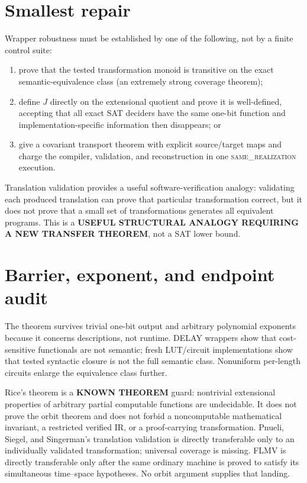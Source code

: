 \documentclass[11pt]{article}
\newcommand{\KNOWN}{\textbf{KNOWN THEOREM}}
\begin{document}
\section{Smallest repair}
Wrapper robustness must be established by one of the following, not by a
finite control suite:
\begin{enumerate}[leftmargin=1.6em]
\item prove that the tested transformation monoid is transitive on the exact
semantic-equivalence class (an extremely strong coverage theorem);
\item define $J$ directly on the extensional quotient and prove it is
well-defined, accepting that all exact SAT deciders have the same one-bit
function and implementation-specific information then disappears; or
\item give a covariant transport theorem with explicit source/target maps and
charge the compiler, validation, and reconstruction in one
\textsc{same\_realization} execution.
\end{enumerate}
Translation validation provides a useful software-verification analogy:
validating each produced translation can prove that particular transformation
correct, but it does not prove that a small set of transformations generates
all equivalent programs.  This is a \textbf{USEFUL STRUCTURAL ANALOGY
REQUIRING A NEW TRANSFER THEOREM}, not a SAT lower bound.

\section{Barrier, exponent, and endpoint audit}
The theorem survives trivial one-bit output and arbitrary polynomial
exponents because it concerns descriptions, not runtime.  DELAY wrappers
show that cost-sensitive functionals are not semantic; fresh LUT/circuit
implementations show that tested syntactic closure is not the full semantic
class.  Nonuniform per-length circuits enlarge the equivalence class further.

Rice's theorem is a \KNOWN{} guard: nontrivial extensional properties of
arbitrary partial computable functions are undecidable.  It does not prove
the orbit theorem and does not forbid a noncomputable mathematical invariant,
a restricted verified IR, or a proof-carrying transformation.  Pnueli,
Siegel, and Singerman's translation validation is directly transferable only
to an individually validated transformation; universal coverage is missing.
FLMV is directly transferable only after the same ordinary machine is proved
to satisfy its simultaneous time--space hypotheses.  No orbit argument
supplies that landing.
\end{document}
